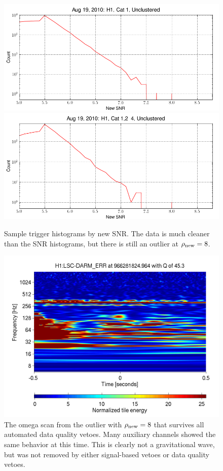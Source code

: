 \begin{figure}
  \includegraphics[width=0.5\linewidth]{figures/detchar/H1_1_UNCLUSTERED_new_snr_hist.png}
  \includegraphics[width=0.5\linewidth]{figures/detchar/H1_4_UNCLUSTERED_new_snr_hist.png}
  \caption[Trigger new SNR histograms for H1]{
  \label{f:daily_ihope_gaussianity_newsnr}
Sample trigger histograms by new SNR. The data is much cleaner than
the SNR histograms, but there is still an outlier at $\rho_{\textrm{new}}=8$.}
\end{figure}%



\begin{figure}
  \includegraphics[width=\linewidth]{figures/detchar/966281824_963867187_H1_LSC-DARM_ERR_1_00_spectrogram_whitened}
  \caption[Omega scan of the loudest $\newsnr$ trigger]{
  \label{f:daily_loudest_glitch}
The omega scan from the outlier with $\rho_{\textrm{new}}=8$ that survives all
automated data quality vetoes.  Many auxiliary channels showed the
same behavior at this time.  This is clearly not a gravitational wave,
but was not removed by either signal-based vetoes or data quality
vetoes.}
\end{figure}%


